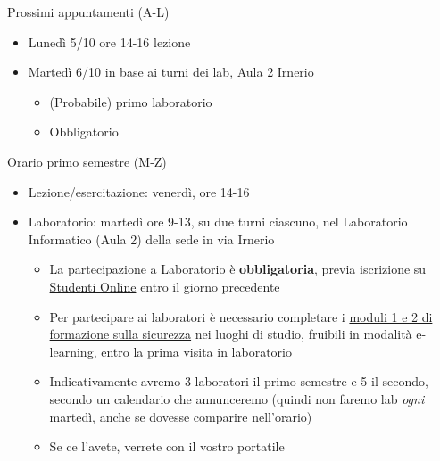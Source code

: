 \begin{frame}{Prossimi appuntamenti (A-L) \insertcontinuationtext}

  \begin{itemize}
  \item Lunedì 5/10 ore 14-16 lezione
  \item Martedì 6/10 in base ai turni dei lab, Aula 2 Irnerio
    \begin{itemize}
    \item (Probabile) primo laboratorio
    \item Obbligatorio
    \end{itemize}
  \end{itemize}

\end{frame}

\begin{frame}{Orario primo semestre (M-Z)}
  \begin{itemize}
  \item Lezione/esercitazione: venerdì, ore 14-16
  \item Laboratorio: martedì ore 9-13, su due
    turni ciascuno, nel Laboratorio Informatico (Aula 2) della sede in via Irnerio
    \begin{itemize}
    \item La partecipazione a Laboratorio è \textbf{obbligatoria}, previa
      iscrizione su \href{https://studenti.unibo.it/sol/}{Studenti Online}
      entro il giorno precedente
    \item Per partecipare ai laboratori è necessario completare i
      \href{https://site.unibo.it/tutela-promozione-salute-sicurezza/it/corsi-di-formazione/formazione-obbligatoria-su-sicurezza-e-salute-per-svolgimento-di-tirocinio-tesi-laboratorio}{moduli
        1 e 2 di formazione sulla sicurezza} nei luoghi di studio, fruibili in
      modalità e-learning, entro la prima visita in laboratorio
    \item Indicativamente avremo 3 laboratori il primo semestre e 5 il secondo,
      secondo un calendario che annunceremo (quindi non faremo lab \textit{ogni}
      martedì, anche se dovesse comparire nell'orario)
    \item Se ce l'avete, verrete con il vostro portatile
    \end{itemize}
  \end{itemize}
\end{frame}

